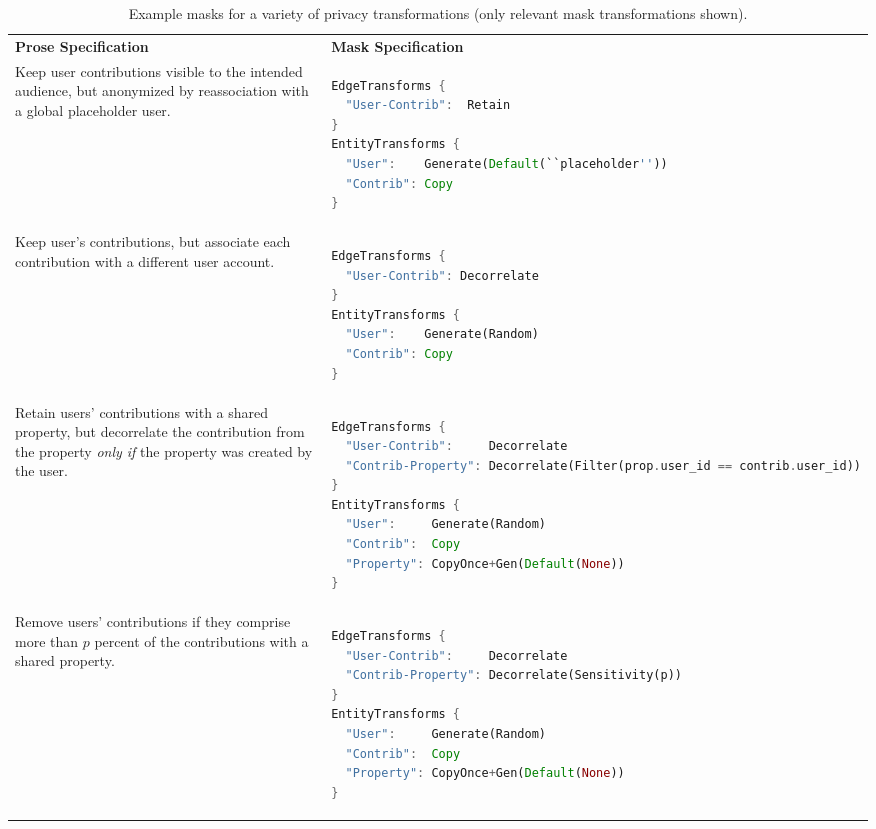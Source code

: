 \begin{table*}[h!]
    \footnotesize
    \begin{tabular}{p{}|p{}}
\centering\textbf{Prose Specification} & \textbf{Mask Specification} \\

Keep user contributions visible to the intended audience, but anonymized by reassociation with a global
placeholder user.
        &
\begin{lstlisting}[language=Rust]
EdgeTransforms {
  "User-Contrib":  Retain
}
EntityTransforms {
  "User":    Generate(Default(``placeholder'')) 
  "Contrib": Copy
}
\end{lstlisting}

    \\

%

Keep user's contributions, but associate each contribution with a different user account.
    &
\begin{lstlisting}[language=Rust]
EdgeTransforms {
  "User-Contrib": Decorrelate
}
EntityTransforms {
  "User":    Generate(Random)
  "Contrib": Copy
}
\end{lstlisting}

\\
Retain users' contributions with a shared property, but decorrelate the contribution
from the property \emph{only if} the property was created by
the user.
        &
\begin{lstlisting}[language=Rust]
EdgeTransforms {
  "User-Contrib":     Decorrelate
  "Contrib-Property": Decorrelate(Filter(prop.user_id == contrib.user_id))
}
EntityTransforms {
  "User":     Generate(Random)
  "Contrib":  Copy
  "Property": CopyOnce+Gen(Default(None)) 
}
\end{lstlisting}

        \\

Remove users' contributions if they comprise more than $p$ percent of the contributions
        with a shared property.
        &
\begin{lstlisting}[language=Rust]
EdgeTransforms {
  "User-Contrib":     Decorrelate
  "Contrib-Property": Decorrelate(Sensitivity(p))
}
EntityTransforms {
  "User":     Generate(Random)
  "Contrib":  Copy
  "Property": CopyOnce+Gen(Default(None)) 
}
\end{lstlisting}
\end{tabular}

\caption{Example masks for a variety of privacy transformations (only relevant
mask transformations shown).}
\label{tab:masks}
\end{table*}


